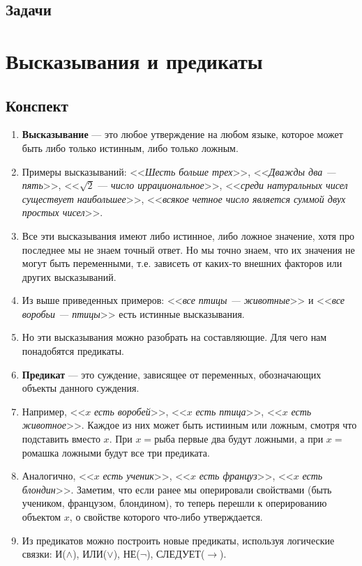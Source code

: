 \subsection{Задачи}

\section{Высказывания и предикаты}

\subsection{Конспект}
\begin{enumerate}\setlength{\itemsep}{1pt}
\item \textbf{Высказывание} --- это любое утверждение на любом языке, которое может быть либо только истинным, либо только ложным.
\item Примеры высказываний: <<\textit{Шесть больше трех}>>, <<\textit{Дважды два --- пять}>>, <<$\sqrt 2$ --- \textit{число иррациональное}>>, <<\textit{среди натуральных чисел существует наибольшее}>>, <<\textit{всякое четное число является суммой двух простых чисел}>>.
\item Все эти высказывания имеют либо истинное, либо ложное значение, хотя про последнее мы не знаем точный ответ. Но мы точно знаем, что их значения не могут быть переменными, т.е. зависеть от каких-то внешних факторов или других высказываний.
\item Из выше приведенных примеров: <<\textit{все птицы --- животные}>> и <<\textit{все воробьи --- птицы}>> есть истинные высказывания.
\item Но эти высказывания можно разобрать на составляющие. Для чего нам понадобятся предикаты.
\item \textbf{Предикат} --- это суждение, зависящее от переменных, обозначающих объекты данного суждения.
\item Например, <<$x$ \textit{есть воробей}>>, <<$x$ \textit{есть птица}>>, <<$x$ \textit{есть животное}>>. Каждое из них может быть истииным или ложным, смотря что подставить вместо $x$. При $x=$рыба первые два будут ложными, а при $x=$ромашка ложными будут все три предиката.
\item Аналогично, <<$x$ \textit{есть ученик}>>, <<$x$ \textit{есть француз}>>, <<$x$ \textit{есть блондин}>>. Заметим, что если ранее мы оперировали свойствами (быть учеником, французом, блондином), то теперь перешли к оперированию объектом $x$, о свойстве которого что-либо утверждается.
\item Из предикатов можно построить новые предикаты, используя логические связки: И($\land$), ИЛИ($\lor$), НЕ($\neg$), СЛЕДУЕТ($\to$).

\end{enumerate}
